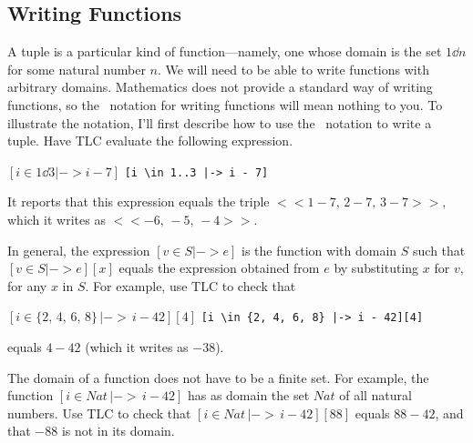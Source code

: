 \documentclass[fleqn,leqno]{article}
\begin{document}
%
\subsection{Writing Functions} 

A tuple is a particular kind of function---namely, one whose domain is
the set $1\dd n$ for some natural number $n$.  We will need to be able
to write functions with arbitrary domains.  Mathematics does not
provide a standard way of writing functions, so the \tlaplus\ notation
for writing functions will mean nothing to you.  To illustrate the
notation, I'll first describe how to use the \tlaplus\ notation to
write a tuple.  Have TLC evaluate the following expression.%
\begin{twocols}
$[i \in 1\dd3 |-> i-7]$
\midcol
\verb=[i \in 1..3 |-> i - 7]=
\end{twocols}
It reports that this expression equals the triple 
 $<<1\!-\!7,\, 2\!-\!7,\, 3\!-\!7>>$,
which it writes as
  $<<-6,\, -5,\, -4>>$.

In general, the expression
 $ [v \in S |-> e]$
is the function with domain $S$ such that
 $ [v \in S |-> e][x]
 $
equals the expression obtained from $e$ by substituting $x$ for $v$,
for any $x$ in $S$\@.
For example, use TLC to check that
\begin{twocols}
$[i \in \{2,\, 4,\, 6,\, 8\}\, |-> \, i - 42][4]$
\midcol
\verb=[i \in {2, 4, 6, 8} |-> i - 42][4]=
\end{twocols}
equals $4-42$ (which it writes as $-38$).

The domain of a function does not have to be a finite set.  For example,
the function $[i \in Nat \, |-> \, i - 42]$ has as domain the set
$Nat$ of all natural numbers.  Use TLC to check that
  $[i \in Nat \, |-> \, i - 42][88]$
equals $88-42$, and that $-88$ is not in its domain.

\bigskip
\end{document}
